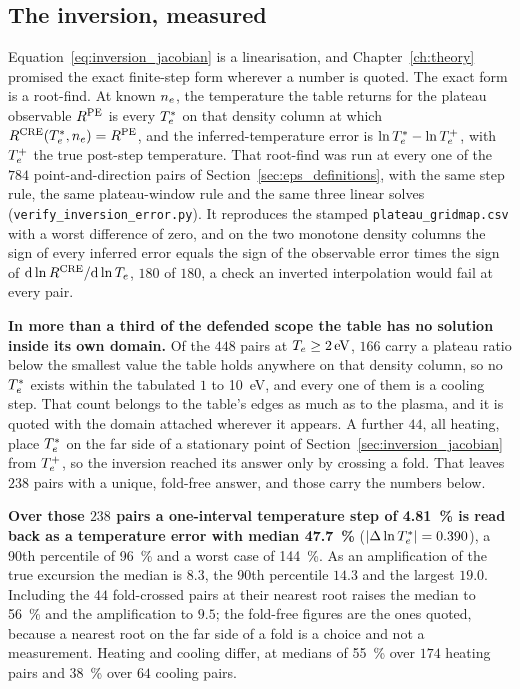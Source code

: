 \subsection{The inversion, measured}
\label{sec:inversion_measured}

Equation~\eqref{eq:inversion_jacobian} is a linearisation, and
Chapter~\ref{ch:theory} promised the exact finite-step form wherever a number
is quoted. The exact form is a root-find. At known $n_e$, the temperature the
table returns for the plateau observable $R^{\mathrm{PE}}$ is every $T_e^{*}$ on that
density column at which $R^{\mathrm{CRE}}(T_e^{*},n_e) = R^{\mathrm{PE}}$, and the
inferred-temperature error is $\ln T_e^{*} - \ln T_e^{+}$, with $T_e^{+}$ the
true post-step temperature. That root-find was run at every one of the $784$
point-and-direction pairs of Section~\ref{sec:eps_definitions}, with the same
step rule, the same plateau-window rule and the same three linear solves
(\texttt{verify\_inversion\_error.py}). It reproduces the stamped
\texttt{plateau\_gridmap.csv} with a worst difference of zero, and on the two
monotone density columns the sign of every inferred error equals the sign of
the observable error times the sign of $\mathrm{d}\ln R^{\mathrm{CRE}}/\mathrm{d}\ln T_e$,
$180$ of $180$, a check an inverted interpolation would fail at every pair.

\textbf{In more than a third of the defended scope the table has no solution
inside its own domain.} Of the $448$ pairs at $T_e\ge\SI{2}{\electronvolt}$,
$166$ carry a plateau ratio below the smallest value the table holds anywhere
on that density column, so no $T_e^{*}$ exists within the tabulated $1$ to
\SI{10}{\electronvolt}, and every one of them is a cooling step. That count
belongs to the table's edges as much as to the plasma, and it is quoted with
the domain attached wherever it appears. A further $44$, all heating, place
$T_e^{*}$ on the far side of a stationary point of
Section~\ref{sec:inversion_jacobian} from $T_e^{+}$, so the inversion reached
its answer only by crossing a fold. That leaves $238$ pairs with a unique,
fold-free answer, and those carry the numbers below.

\textbf{Over those $238$ pairs a one-interval temperature step of
\SI{4.81}{\percent} is read back as a temperature error with median
\SI{47.7}{\percent}} ($|\Delta\ln T_e^{*}| = 0.390$), a 90th percentile of
\SI{96}{\percent} and a worst case of \SI{144}{\percent}. As an amplification
of the true excursion the median is $8.3$, the 90th percentile $14.3$ and the
largest $19.0$. Including the $44$ fold-crossed pairs at their nearest root
raises the median to \SI{56}{\percent} and the amplification to $9.5$; the
fold-free figures are the ones quoted, because a nearest root on the far side
of a fold is a choice and not a measurement. Heating and cooling differ, at
medians of \SI{55}{\percent} over $174$ heating pairs and \SI{38}{\percent}
over $64$ cooling pairs.

